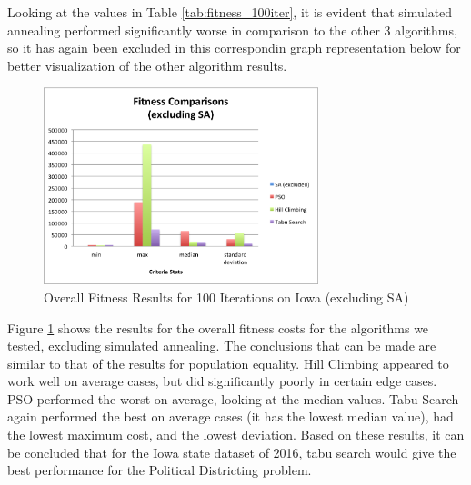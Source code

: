 \documentclass[journal]{IEEEtran}
\begin{document}
Looking at the values in Table \ref{tab:fitness_100iter}, it is evident that simulated annealing performed significantly worse in comparison to the other 3 algorithms, so it has again been excluded in this correspondin graph representation below for better visualization of the other algorithm results.

\begin{figure}[h!]
    \includegraphics[width=8cm]{images/fitness_graph.png}
    \centering
    \caption{Overall Fitness Results for 100 Iterations on Iowa (excluding SA)}
    \label{fig:fitness_results}
\end{figure}

Figure \ref{fig:fitness_results} shows the results for the overall fitness costs for the algorithms we tested, excluding simulated annealing. The conclusions that can be made are similar to that of the results for population equality. Hill Climbing appeared to work well on average cases, but did significantly poorly in certain edge cases. PSO performed the worst on average, looking at the median values. Tabu Search again performed the best on average cases (it has the lowest median value), had the lowest maximum cost, and the lowest deviation. Based on these results, it can be concluded that for the Iowa state dataset of 2016, tabu search would give the best performance for the Political Districting problem.
\end{document}
